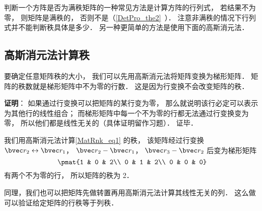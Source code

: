判断一个方阵是否为满秩矩阵的一种常见方法是计算方阵的行列式， 若结果不为零， 则矩阵是满秩的， 否则不是（\autoref{DetPro_the2}~）． 注意非满秩的情况下行列式并不能判断秩具体是多少． 另一种更简单的方法是使用下面的高斯消元法．

\subsection{高斯消元法计算秩}
要确定任意矩阵秩的大小， 我们可以先用高斯消元法将矩阵变换为梯形矩阵． 矩阵的秩数就是梯形矩阵中不为零的行数． 这是因为行变换不会改变矩阵的秩．

\textbf{证明}： 如果通过行变换可以把矩阵的某行变为零， 那么就说明该行必定可以表示为其他行的线性组合； 而梯形矩阵中每一个不为零的行都无法通过行变换变为零， 所以他们都是线性无关的（具体证明留作习题）． 证毕．

\begin{example}{}
我们用高斯消元法计算\autoref{MatRnk_eq1} 的秩， 该矩阵经过行变换 $\bvec r_2 \leftrightarrow \bvec r_1$， $\bvec r_2 - \bvec r_1$， $\bvec r_3 - \bvec r_2$ 后变为梯形矩阵
\begin{equation}
\pmat{1 & 0 & 2\\ 0 & 1 & 2\\ 0 & 0 & 0}
\end{equation}
有两个不为零的行， 所以矩阵的秩为 2．
\end{example}

同理，我们也可以把矩阵先做转置再用高斯消元法计算其线性无关的列． 这么做可以验证给定矩阵的行秩等于列秩．
